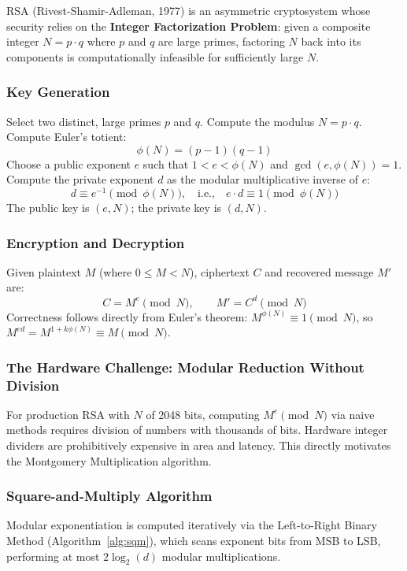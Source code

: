 \documentclass[conference, a4paper]{IEEEtran}
\begin{document}
RSA (Rivest-Shamir-Adleman, 1977) \cite{b6} is an asymmetric cryptosystem whose security relies on the \textbf{Integer Factorization Problem}: given a composite integer $N = p \cdot q$ where $p$ and $q$ are large primes, factoring $N$ back into its components is computationally infeasible for sufficiently large $N$.

\subsubsection*{Key Generation}
Select two distinct, large primes $p$ and $q$. Compute the modulus $N = p \cdot q$. Compute Euler's totient:
\begin{equation}
    \phi(N) = (p-1)(q-1)
\end{equation}
Choose a public exponent $e$ such that $1 < e < \phi(N)$ and $\gcd(e, \phi(N)) = 1$. Compute the private exponent $d$ as the modular multiplicative inverse of $e$:
\begin{equation}
    d \equiv e^{-1} \pmod{\phi(N)}, \quad \text{i.e.,} \quad e \cdot d \equiv 1 \pmod{\phi(N)}
\end{equation}
The public key is $(e, N)$; the private key is $(d, N)$.

\subsubsection*{Encryption and Decryption}
Given plaintext $M$ (where $0 \leq M < N$), ciphertext $C$ and recovered message $M'$ are:
\begin{equation}
    C = M^e \pmod{N}, \qquad M' = C^d \pmod{N}
\end{equation}
Correctness follows directly from Euler's theorem: $M^{\phi(N)} \equiv 1 \pmod{N}$, so $M^{ed} = M^{1 + k\phi(N)} \equiv M \pmod{N}$.

\subsubsection*{The Hardware Challenge: Modular Reduction Without Division}
For production RSA with $N$ of 2048 bits, computing $M^e \pmod{N}$ via naive methods requires division of numbers with thousands of bits. Hardware integer dividers are prohibitively expensive in area and latency. This directly motivates the Montgomery Multiplication algorithm.

\subsubsection*{Square-and-Multiply Algorithm}
Modular exponentiation is computed iteratively via the Left-to-Right Binary Method (Algorithm~\ref{alg:sqm}), which scans exponent bits from MSB to LSB, performing at most $2\log_2(d)$ modular multiplications.
\end{document}
